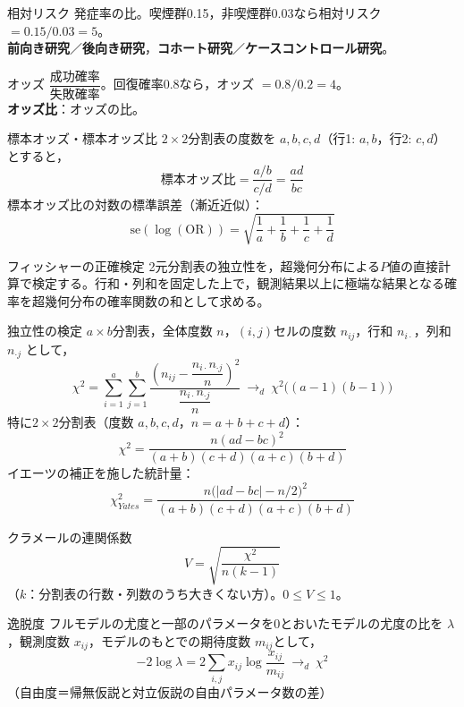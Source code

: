 \documentclass[a4paper,11pt]{ltjsarticle}
\begin{document}
\begin{term}{相対リスク}
発症率の比。喫煙群0.15，非喫煙群0.03なら相対リスク $=0.15/0.03=5$。\\
\textbf{前向き研究}／\textbf{後向き研究}，\textbf{コホート研究}／\textbf{ケースコントロール研究}。
\end{term}

\begin{term}{オッズ}
$\dfrac{\text{成功確率}}{\text{失敗確率}}$。回復確率0.8なら，オッズ $=0.8/0.2=4$。\\
\textbf{オッズ比}：オッズの比。
\end{term}

\begin{term}{標本オッズ・標本オッズ比}
$2\times2$分割表の度数を $a,b,c,d$（行1: $a,b$，行2: $c,d$）とすると，
\[
\text{標本オッズ比} = \frac{a/b}{c/d} = \frac{ad}{bc}
\]
標本オッズ比の対数の標準誤差（漸近近似）：
\[
\mathrm{se}(\log(\mathrm{OR})) = \sqrt{\frac1a+\frac1b+\frac1c+\frac1d}
\]
\end{term}

\begin{term}{フィッシャーの正確検定}
2元分割表の独立性を，超幾何分布による$P$値の直接計算で検定する。行和・列和を固定した上で，観測結果以上に極端な結果となる確率を超幾何分布の確率関数の和として求める。
\end{term}

\begin{term}{独立性の検定}
$a\times b$分割表，全体度数 $n$，$(i,j)$セルの度数 $n_{ij}$，行和 $n_{i\cdot}$，列和 $n_{\cdot j}$ として，
\[
\chi^2 = \sum_{i=1}^a\sum_{j=1}^b \frac{\left(n_{ij}-\dfrac{n_{i\cdot}n_{\cdot j}}{n}\right)^2}{\dfrac{n_{i\cdot}n_{\cdot j}}{n}}
\ \to_d\ \chi^2\big((a-1)(b-1)\big)
\]
特に$2\times2$分割表（度数 $a,b,c,d$，$n=a+b+c+d$）：
\[
\chi^2 = \frac{n(ad-bc)^2}{(a+b)(c+d)(a+c)(b+d)}
\]
イエーツの補正を施した統計量：
\[
\chi^2_{Yates} = \frac{n\big(|ad-bc|-n/2\big)^2}{(a+b)(c+d)(a+c)(b+d)}
\]
\end{term}

\begin{term}{クラメールの連関係数}
\[
V = \sqrt{\frac{\chi^2}{n(k-1)}}
\]
（$k$：分割表の行数・列数のうち大きくない方）。$0\le V\le1$。
\end{term}

\begin{term}{逸脱度}
フルモデルの尤度と一部のパラメータを0とおいたモデルの尤度の比を $\lambda$，観測度数 $x_{ij}$，モデルのもとでの期待度数 $m_{ij}$として，
\[
-2\log\lambda = 2\sum_{i,j} x_{ij}\log\frac{x_{ij}}{m_{ij}} \ \to_d\ \chi^2
\]
（自由度＝帰無仮説と対立仮説の自由パラメータ数の差）
\end{term}
\end{document}
